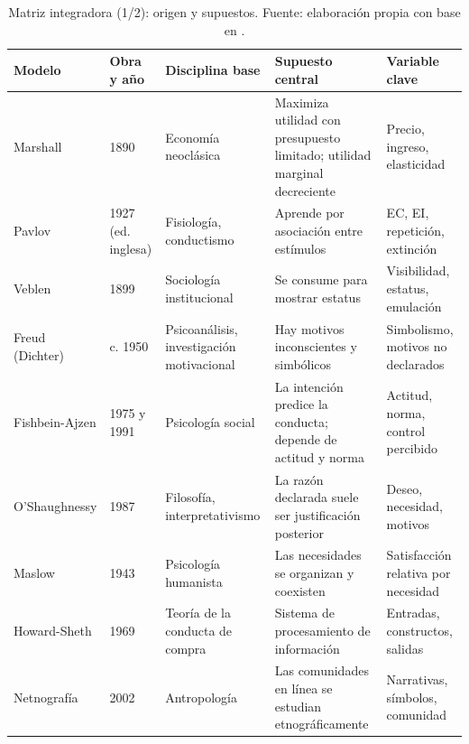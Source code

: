 \begin{table}[!htb]
\centering
\scriptsize
\begin{tabular}{@{}>{\raggedright}p{2.1cm}>{\raggedright}p{1.5cm}>{\raggedright}p{2.0cm}>{\raggedright}p{3.4cm}>{\raggedright\arraybackslash}p{2.8cm}@{}}
\toprule
Modelo & Obra y año & Disciplina base & Supuesto central & Variable clave \\
\midrule
Marshall & 1890 & Economía neoclásica & Maximiza utilidad con presupuesto limitado; utilidad marginal decreciente & Precio, ingreso, elasticidad \\
Pavlov & 1927 (ed. inglesa) & Fisiología, conductismo & Aprende por asociación entre estímulos & EC, EI, repetición, extinción \\
Veblen & 1899 & Sociología institucional & Se consume para mostrar estatus & Visibilidad, estatus, emulación \\
Freud (Dichter) & c. 1950 & Psicoanálisis, investigación motivacional & Hay motivos inconscientes y simbólicos & Simbolismo, motivos no declarados \\
Fishbein-Ajzen & 1975 y 1991 & Psicología social & La intención predice la conducta; depende de actitud y norma & Actitud, norma, control percibido \\
O'Shaughnessy & 1987 & Filosofía, interpretativismo & La razón declarada suele ser justificación posterior & Deseo, necesidad, motivos \\
Maslow & 1943 & Psicología humanista & Las necesidades se organizan y coexisten & Satisfacción relativa por necesidad \\
Howard-Sheth & 1969 & Teoría de la conducta de compra & Sistema de procesamiento de información & Entradas, constructos, salidas \\
Netnografía & 2002 & Antropología & Las comunidades en línea se estudian etnográficamente & Narrativas, símbolos, comunidad \\
\bottomrule
\end{tabular}
\caption{Matriz integradora (1/2): origen y supuestos. Fuente: elaboración
propia con base en \textcite{marshall1890,pavlov1927,veblen1899,dichter1960,
fishbein1975,ajzen1991,oshaughnessy1987,maslow1943,howardsheth1969,kozinets2002}.}
\label{tab:cap09-matriz1}
\end{table}

